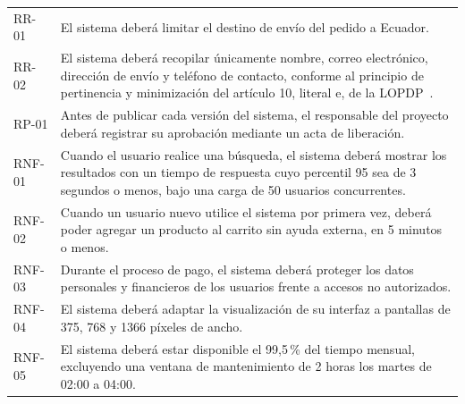 \documentclass[11pt,a4paper]{article}
\begin{document}
\begin{longtable}{>{\raggedright\arraybackslash}p{1.6cm}
                  >{\raggedright\arraybackslash}p{12.6cm}}
RR-01 & El sistema deberá limitar el destino de envío del pedido a
Ecuador. \\
RR-02 & El sistema deberá recopilar únicamente nombre, correo electrónico,
dirección de envío y teléfono de contacto, conforme al principio de
pertinencia y minimización del artículo 10, literal e, de la
LOPDP~\cite{lopdp2021}. \\
RP-01 & Antes de publicar cada versión del sistema, el responsable del
proyecto deberá registrar su aprobación mediante un acta de liberación. \\
RNF-01 & Cuando el usuario realice una búsqueda, el sistema deberá mostrar
los resultados con un tiempo de respuesta cuyo percentil 95 sea de 3
segundos o menos, bajo una carga de 50 usuarios concurrentes. \\
RNF-02 & Cuando un usuario nuevo utilice el sistema por primera vez,
deberá poder agregar un producto al carrito sin ayuda externa, en 5
minutos o menos. \\
RNF-03 & Durante el proceso de pago, el sistema deberá proteger los datos
personales y financieros de los usuarios frente a accesos no autorizados. \\
RNF-04 & El sistema deberá adaptar la visualización de su interfaz a
pantallas de 375, 768 y 1366 píxeles de ancho. \\
RNF-05 & El sistema deberá estar disponible el 99,5\,\% del tiempo mensual,
excluyendo una ventana de mantenimiento de 2 horas los martes de 02:00 a
04:00. \\
\end{longtable}
\end{document}
